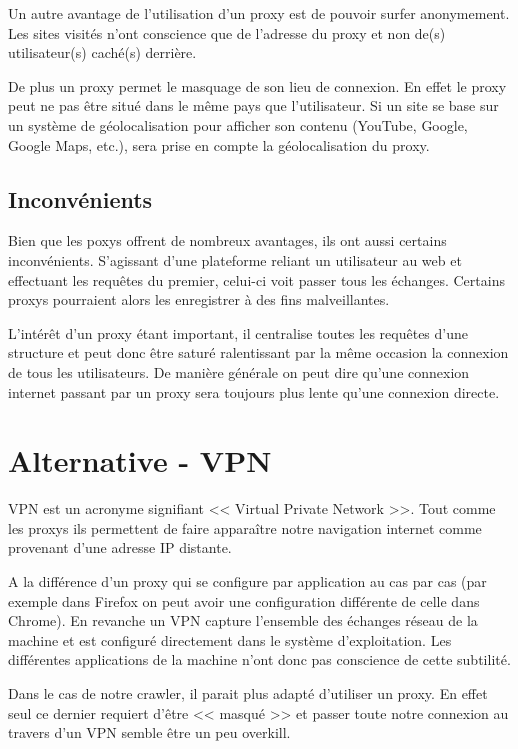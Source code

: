 \documentclass[hideweeklyreports,noposter]{polytech/polytech}
\begin{document}
				Un autre avantage de l'utilisation d'un proxy est de pouvoir surfer anonymement. Les sites visités n'ont conscience que de l'adresse du proxy et non de(s) utilisateur(s) caché(s) derrière.
				
				De plus un proxy permet le masquage de son lieu de connexion. En effet le proxy peut ne pas être situé dans le même pays que l'utilisateur.
				Si un site se base sur un système de géolocalisation pour afficher son contenu (YouTube, Google, Google Maps, etc.), sera prise en compte la géolocalisation du proxy.
				
			\subsection{Inconvénients}
				Bien que les poxys offrent de nombreux avantages, ils ont aussi certains inconvénients.
				S'agissant d'une plateforme reliant un utilisateur au web et effectuant les requêtes du premier, celui-ci voit passer tous les échanges.
				Certains proxys pourraient alors les enregistrer à des fins malveillantes.
				
				L'intérêt d'un proxy étant important, il centralise toutes les requêtes d'une structure et peut donc être saturé ralentissant par la même occasion la connexion de tous les utilisateurs.
				De manière générale on peut dire qu'une connexion internet passant par un proxy sera toujours plus lente qu'une connexion directe.
				
		\section{Alternative - VPN}
			VPN est un acronyme signifiant << Virtual Private Network >>.
			Tout comme les proxys ils permettent de faire apparaître notre navigation internet comme provenant d'une adresse IP distante.
			
			A la différence d'un proxy qui se configure par application au cas par cas (par exemple dans Firefox on peut avoir une configuration différente de celle dans Chrome).
			En revanche un VPN capture l'ensemble des échanges réseau de la machine et est configuré directement dans le système d'exploitation.
			Les différentes applications de la machine n'ont donc pas conscience de cette subtilité.
			
			
			Dans le cas de notre crawler, il parait plus adapté d'utiliser un proxy.
			En effet seul ce dernier requiert d'être << masqué >> et passer toute notre connexion au travers d'un VPN semble être un peu overkill.
			
\end{document}
